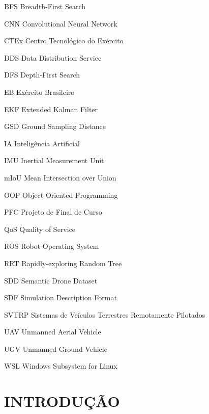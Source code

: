 \documentclass[
    12pt,
    openright,
    oneside,
    a4paper,
    english,
    brazil
]{abntex2}
\begin{document}
\begin{siglas}
    \item[BFS] Breadth-First Search
    \item[CNN] Convolutional Neural Network
    \item[CTEx] Centro Tecnológico do Exército
    \item[DDS] Data Distribution Service
    \item[DFS] Depth-First Search
    \item[EB] Exército Brasileiro
    \item[EKF] Extended Kalman Filter
    \item[GSD] Ground Sampling Distance
    \item[IA] Inteligência Artificial
    \item[IMU] Inertial Measurement Unit
    \item[mIoU] Mean Intersection over Union
    \item[OOP] Object-Oriented Programming
    \item[PFC] Projeto de Final de Curso
    \item[QoS] Quality of Service
    \item[ROS] Robot Operating System
    \item[RRT] Rapidly-exploring Random Tree
    \item[SDD] Semantic Drone Dataset
    \item[SDF] Simulation Description Format
    \item[SVTRP] Sistemas de Veículos Terrestres Remotamente Pilotados
    \item[UAV] Unmanned Aerial Vehicle
    \item[UGV] Unmanned Ground Vehicle
    \item[WSL] Windows Subsystem for Linux
\end{siglas}

\tableofcontents*
\cleardoublepage

\textual

\chapter{INTRODUÇÃO}
\end{document}
